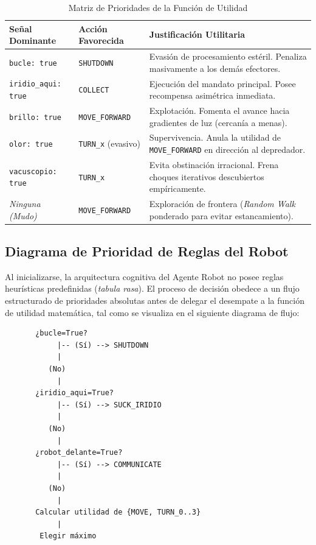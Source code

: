 \documentclass[conference]{IEEEtran}
\begin{document}
\begin{table}[htbp]
\caption{Matriz de Prioridades de la Función de Utilidad}
\begin{center}
\begin{tabular}{|>{\raggedright\arraybackslash}p{2.6cm}|>{\raggedright\arraybackslash}p{2.2cm}|>{\raggedright\arraybackslash}p{2.7cm}|}
\hline
\textbf{Señal Dominante} & \textbf{Acción Favorecida} & \textbf{Justificación Utilitaria} \\
\hline
\texttt{bucle: true} & \texttt{SHUTDOWN} & Evasión de procesamiento estéril. Penaliza masivamente a los demás efectores. \\
\hline
\texttt{iridio\_aqui: true} & \texttt{COLLECT} & Ejecución del mandato principal. Posee recompensa asimétrica inmediata. \\
\hline
\texttt{brillo: true} & \texttt{MOVE\_FORWARD} & Explotación. Fomenta el avance hacia gradientes de luz (cercanía a menas). \\
\hline
\texttt{olor: true} & \texttt{TURN\_x} (evasivo) & Supervivencia. Anula la utilidad de \texttt{MOVE\_FORWARD} en dirección al depredador. \\
\hline
\texttt{vacuscopio: true} & \texttt{TURN\_x} & Evita obstinación irracional. Frena choques iterativos descubiertos empíricamente. \\
\hline
\textit{Ninguna (Mudo)} & \texttt{MOVE\_FORWARD} & Exploración de frontera (\textit{Random Walk} ponderado para evitar estancamiento). \\
\hline
\end{tabular}
\end{center}
\end{table}

\subsection{Diagrama de Prioridad de Reglas del Robot}
Al inicializarse, la arquitectura cognitiva del Agente Robot no posee reglas heurísticas predefinidas (\textit{tabula rasa}). El proceso de decisión obedece a un flujo estructurado de prioridades absolutas antes de delegar el desempate a la función de utilidad matemática, tal como se visualiza en el siguiente diagrama de flujo:

\begin{verbatim}
       ¿bucle=True? 
            |-- (Sí) --> SHUTDOWN
            |
          (No)
            |
       ¿iridio_aqui=True? 
            |-- (Sí) --> SUCK_IRIDIO
            |
          (No)
            |
       ¿robot_delante=True? 
            |-- (Sí) --> COMMUNICATE
            |
          (No)
            |
       Calcular utilidad de {MOVE, TURN_0..3} 
            |
        Elegir máximo
\end{verbatim}
\end{document}
